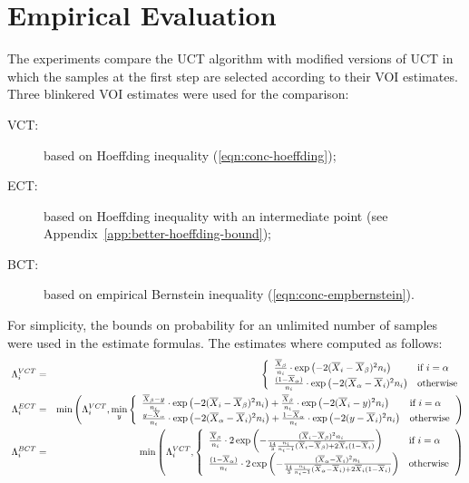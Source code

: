 \documentclass{article}
\begin{document}
\section{Empirical Evaluation}
\label{sec:empirical-evaluation}

The experiments compare the UCT algorithm \cite{Kocsis.uct} with
modified versions of UCT in which the samples at the first step are
selected according to their VOI estimates. Three blinkered VOI
estimates were used for the comparison:
\begin{description}
\item[VCT:] based on Hoeffding inequality (\ref{eqn:conc-hoeffding});
\item[ECT:] based on Hoeffding inequality with an intermediate point (see
Appendix~\ref{app:better-hoeffding-bound});
\item[BCT:] based on empirical Bernstein inequality
(\ref{eqn:conc-empbernstein}).
\end{description}
For simplicity, the bounds on probability for an unlimited number
of samples were used in the estimate formulas. The estimates where
computed as follows:
\begin{eqnarray}\
  \Lambda_i^{VCT}& =&\left\{
  \begin{array}{l l}
    \frac {\overline X_\beta} {n_i} \cdot \exp\left(- 2(\overline X_i - \overline X_\beta)^2 n_i\right)
      & \mbox{{\rm if} $i=\alpha$} \\
    \frac {(1-\overline  X_\alpha)} {n_i}\cdot \exp\left(- 2(\overline X_\alpha - \overline X_i)^2 n_i\right)
      &  \mbox{\rm otherwise}
  \end{array}  \right.\nonumber\\
  \Lambda_i^{ECT}& =&\min\left(\Lambda_i^{VCT}, \min_y\left\{
  \begin{array}{l l}
    \frac {\overline X_\beta-y} {n_i}\cdot \exp\left(-2 (\overline X_i-\overline X_\beta)^2n_i\right)
    +\frac {\overline X_\beta} {n_i}\cdot \exp\left(-2 (\overline X_i-y)^2n_i\right)
      & \mbox{{\rm if} $i=\alpha$} \\
\frac {y-\overline X_\alpha} {n_i}\cdot \exp\left(-2(\overline X_\alpha-\overline X_i)^2n_i\right)
    +\frac {1-\overline X_\alpha} {n_i}\cdot \exp\left(-2 (y-\overline X_i)^2n_i\right)
      &  \mbox{\rm otherwise}
  \end{array} \right.\right) \nonumber\\
  \Lambda_i^{BCT}& =&\min\left(\Lambda_i^{VCT},\left\{
  \begin{array}{l l}
    \frac {\overline X_\beta} {n_i}\cdot 2\exp\left(- \frac {(\overline X_i - \overline X_\beta)^2 n_i} {\frac {14} 3 \frac {n_i} {n_i-1}(\overline X_i - \overline X_\beta) + 2 \overline X_i(1-\overline X_i)} \right)
      & \mbox{{\rm if} $i=\alpha$} \\
    \frac {(1-\overline  X_\alpha)} {n_i}\cdot 2\exp\left(- \frac {(\overline X_\alpha - \overline X_i)^2 n_i} {\frac {14} 3 \frac {n_i} {n_i-1}(\overline X_\alpha - \overline X_i) + 2 \overline X_i(1-\overline X_i)} \right)
      &  \mbox{\rm otherwise}
  \end{array} \right.\right)
\label{eqn:emp-estimates}
\end{eqnarray}
\end{document}
